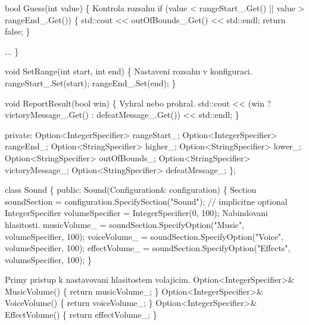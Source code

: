 \begin{DoxyPre}{\ttfamily     bool Guess(int value)
    \{
Kontrola rozsahu
        if (value < rangeStart\_.Get() || value > rangeEnd\_.Get())
        \{
            std::cout << outOfBounds\_.Get() << std::endl;
            return false;
        \}}\end{DoxyPre}



\begin{DoxyPre}{\ttfamily          ... 
    \}}\end{DoxyPre}



\begin{DoxyPre}{\ttfamily     void SetRange(int start, int end)
    \{
Nastaveni rozsahu v konfiguraci.
        rangeStart\_.Set(start);
        rangeEnd\_.Set(end);
    \}}\end{DoxyPre}



\begin{DoxyPre}{\ttfamily     void ReportResult(bool win)
    \{
Vyhral nebo prohral.
        std::cout << (win ? victoryMessage\_.Get() : defeatMessage\_.Get()) << std::endl;
    \}}\end{DoxyPre}



\begin{DoxyPre}{\ttfamily private:
    Option<IntegerSpecifier> rangeStart\_;
    Option<IntegerSpecifier> rangeEnd\_;
    Option<StringSpecifier> higher\_;
    Option<StringSpecifier> lower\_;
    Option<StringSpecifier> outOfBounds\_;
    Option<StringSpecifier> victoryMessage\_;
    Option<StringSpecifier> defeatMessage\_;
\};}\end{DoxyPre}



\begin{DoxyPre}{\ttfamily class Sound
\{
public:
    Sound(Configuration& configuration)
    \{
        Section soundSection = configuration.SpecifySection("Sound"); // implicitne optional 
        IntegerSpecifier volumeSpecifier = IntegerSpecifier(0, 100);
Nabindovani hlasitosti.
        musicVolume\_ = soundSection.SpecifyOption("Music", volumeSpecifier, 100);
        voiceVolume\_ = soundSection.SpecifyOption("Voice", volumeSpecifier, 100);
        effectVolume\_ = soundSection.SpecifyOption("Effects", volumeSpecifier, 100);
    \}}\end{DoxyPre}



\begin{DoxyPre}{\ttfamily Primy pristup k nastavovani hlasitostem volajicim.
    Option<IntegerSpecifier>\& MusicVolume()
    \{
        return musicVolume\_;
    \}
    Option<IntegerSpecifier>\& VoiceVolume()
    \{
        return voiceVolume\_;
    \}
    Option<IntegerSpecifier>\& EffectVolume()
    \{
        return effectVolume\_;
    \}}\end{DoxyPre}



